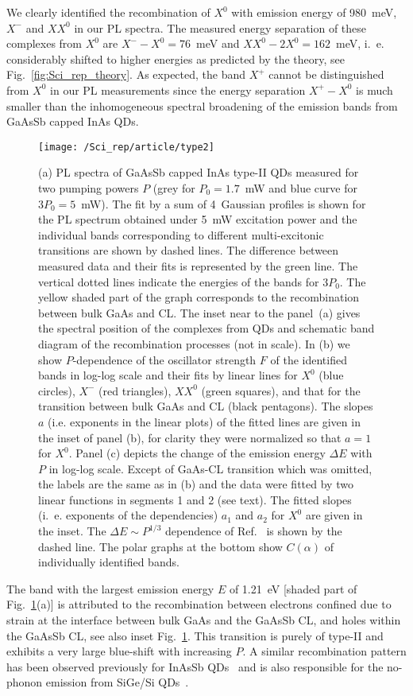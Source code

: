 We clearly identified the recombination of $X^0$ with emission energy of 980~meV, $X^-$ and $XX^0$ in our PL spectra. The measured energy separation of these complexes from $X^0$ are $X^- - X^0=76$~meV and $XX^0-2X^0=162$~meV, i.~e. considerably shifted to higher energies as predicted by the theory, see Fig.~\ref{fig:Sci_rep_theory}. As expected, the band $X^+$ cannot be distinguished from $X^0$ in our PL measurements since the energy separation $X^+-X^0$ is much smaller than the inhomogeneous spectral broadening of the emission bands from GaAsSb capped InAs QDs.%
\begin{figure}
	\centering
	\texttt{[image: /Sci\_rep/article/type2]}
	\caption{(a) PL spectra of GaAsSb capped InAs type-II QDs measured for two pumping powers $P$ (grey for $P_0=1.7$~mW and blue curve for $3P_0=5$~mW). The fit by a sum of 4~Gaussian profiles is shown for the PL spectrum obtained under 5~mW excitation power and the individual bands corresponding to different multi-excitonic transitions are shown by dashed lines. The difference between measured data and their fits is represented by the green line. The vertical dotted lines indicate the energies of the bands for $3P_0$. The yellow shaded part of the graph corresponds to the recombination between bulk GaAs and CL. The inset near to the panel~(a) gives the spectral position of the complexes from QDs and schematic band diagram of the recombination processes (not in scale). In (b) we show $P$-dependence of the oscillator strength $F$ of the identified bands in log-log scale and their fits by linear lines for $X^0$ (blue circles), $X^-$ (red triangles), $XX^0$ (green squares), and that for the transition between bulk GaAs and CL (black pentagons). The slopes $a$ (i.e. exponents in the linear plots) of the fitted lines are given in the inset of panel (b), for clarity they were normalized so that $a=1$ for $X^0$. Panel (c) depicts the change of the emission energy $\Delta E$ with $P$ in log-log scale. Except of GaAs-CL transition which was omitted, the labels are the same as in (b) and the data were fitted by two linear functions in segments 1 and 2 (see text). The fitted slopes (i.~e. exponents of the dependencies) $a_1$ and $a_2$ for $X^0$ are given in the inset. The $\Delta E\sim P^{1/3}$ dependence of Ref.~\citep{Hatami1998} is shown by the dashed line. The polar graphs at the bottom show $C(\alpha)$ of individually identified bands.}
	\label{fig:sci_rep_typeII}
\end{figure}

The band with the largest emission energy $E$ of 1.21~eV [shaded part of Fig.~\ref{fig:sci_rep_typeII}(a)] is attributed to the recombination between electrons confined due to strain at the interface between bulk GaAs and the GaAsSb CL, and holes within the GaAsSb CL, see also inset Fig.~\ref{fig:sci_rep_typeII}. This transition is purely of type-II and exhibits a very large blue-shift with increasing $P$. A similar recombination pattern has been observed previously for InAsSb QDs~\cite{Mazur2012} and is also responsible for the no-phonon emission from SiGe/Si QDs~\cite{SiGeKlenovsky}. 

